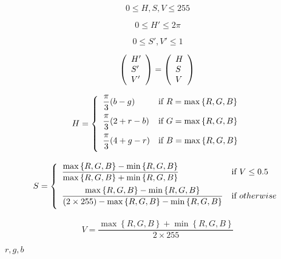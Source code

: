 \documentclass{article}
\begin{document}
\[ 0 \le H, S, V \le 255 \]
\pagebreak

\[ 0 \le H' \le 2\pi \]
\pagebreak

\[ 0 \le S', V' \le 1 \]
\pagebreak

\[ \left( \begin{array}{l} H' \\ S' \\ V' \\ \end{array} \right) = \left( \begin{array}{l} H \\ S \\ V \\ \end{array} \right) \\ \]
\pagebreak

\[ H=\left \{ \begin{array}{ll} \dfrac{\pi}{3}(b - g) & \mbox{if}\ R = \max \left\{ R, G, B \right\} \vspace{.5em} \\ \dfrac{\pi}{3}(2 + r - b) & \mbox{if}\ G = \max \left\{ R, G, B \right\} \vspace{.5em} \\ \dfrac{\pi}{3}(4 + g - r) & \mbox{if}\ B = \max \left\{ R, G, B \right\} \vspace{.5em} \\ \end{array} \right. \]
\pagebreak

\[ S=\left \{ \begin{array}{ll} \dfrac{\max \left\{ R, G, B \right\} - \min \left\{ R, G, B \right\}}{\max \left\{ R, G, B \right\} + \min \left\{ R, G, B \right\}} & \mbox{if}\ V\le 0.5 \vspace{.5em} \\ \dfrac{\max \left\{ R, G, B \right\} - \min \left\{ R, G, B \right\}}{(2\times 255) - \max \left\{ R, G, B \right\} - \min \left\{ R, G, B \right\}} & \mbox{if}\ otherwise \vspace{.5em} \\ \end{array} \right.\]
\pagebreak

\[ V=\frac{\max \left\{ R, G, B \right\} + \min \left\{ R, G, B \right\}}{2\times 255} \]
\pagebreak

$r, g, b$
\pagebreak
\end{document}
